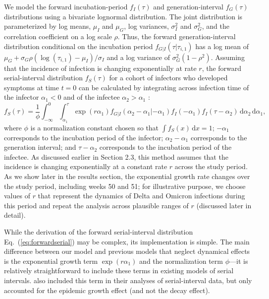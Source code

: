 \documentclass[12pt]{article}
\newcommand{\eref}[1]{Eq.~(\ref{eq:#1})}
\newcommand{\dd}[1]{\ensuremath{\, \mathrm{d}#1}}
\newcommand{\dx}{\dd{x}}
\begin{document}
We model the forward incubation-period $f_I(\tau)$ and generation-interval $f_G(\tau)$ distributions using a bivariate lognormal distribution.
The joint distribution is parameterized by log means, $\mu_I$ and $\mu_G$, log variances, $\sigma_I^2$ and $\sigma_G^2$, and the correlation coefficient on a log scale $\rho$.
Thus, the forward generation-interval distribution conditional on the incubation period $f_{G|I}(\tau|\tau_{i,1})$ has a log mean of $\mu_G + \sigma_G \rho (\log(\tau_{i, 1}) - \mu_I)/\sigma_I$ and a log variance of $\sigma_G^2 (1 - \rho^2)$.
Assuming that the incidence of infection is changing exponentially at rate $r$, the forward serial-interval distribution $f_S(\tau)$ for a cohort of infectors who developed symptoms at time $t = 0$ can be calculated by integrating across infection time of the infector $\alpha_1 < 0$ and of the infectee $\alpha_2 > \alpha_1$ \citep{park2021forward}:
\begin{equation}
f_S(\tau) = \frac{1}{\phi} \int_{-\infty}^0\int_{\alpha_1}^\tau \exp(r \alpha_1) f_{G|I}(\alpha_2 - \alpha_1|- \alpha_1) f_I(- \alpha_1) f_I(\tau - \alpha_2) \dd \alpha_2 \dd \alpha_1,
\label{eq:forwardserial}
\end{equation}
where $\phi$ is a normalization constant chosen so that $\int f_S(x) \dx = 1$;
$-\alpha_1$ corresponds to the incubation period of the infector;
$\alpha_2 - \alpha_1$ corresponds to the generation interval;
and $\tau - \alpha_2$ corresponds to the incubation period of the infectee.
As discussed earlier in Section 2.3, this method assumes that the incidence is changing exponentially at a constant rate $r$ across the study period.
As we show later in the results section, the exponential growth rate changes over the study period, including weeks 50 and 51;
for illustrative purpose, we choose values of $r$ that represent the dynamics of Delta and Omicron infections during this period and repeat the analysis across plausible ranges of $r$ (discussed later in detail).

While the derivation of the forward serial-interval distribution \eref{forwardserial} may be complex, its implementation is simple.
The main difference between our model and previous models that neglect dynamical effects \citep{ganyani2020estimating,he2020temporal,zhao2021estimating,hart2022generation} is the exponential growth term $\exp(r \alpha_1)$ and the normalization term $\phi$---it is relatively straightforward to include these terms in existing models of serial intervals.
\cite{ferretti2020quantifying, ferretti2020timing} also included this term in their analyses of serial-interval data, but only accounted for the epidemic growth effect (and not the decay effect).
\end{document}
